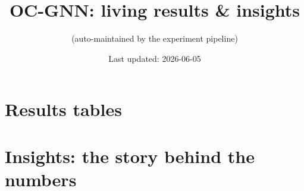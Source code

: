 \documentclass[11pt]{article}
\title{OC-GNN: living results \& insights}
\author{(auto-maintained by the experiment pipeline)}
\date{Last updated: 2026-06-05}
\begin{document}
\maketitle

\section{Results tables}







\section{Insights: the story behind the numbers}

\end{document}

